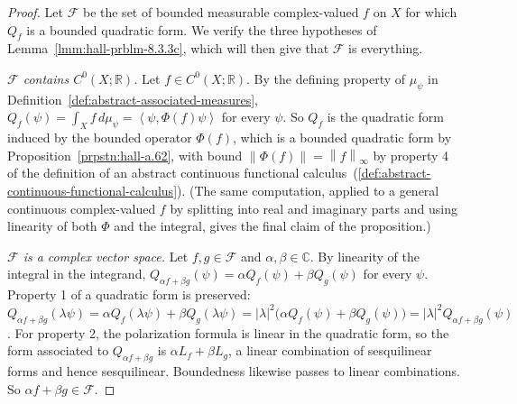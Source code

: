 \begin{proof}
    \leanok
Let $\mathcal{F}$ be the set of bounded measurable complex-valued $f$ on $X$ for which $Q_f$ is a bounded quadratic form. We verify the three hypotheses of Lemma~\ref{lmm:hall-prblm-8.3.3c}, which will then give that $\mathcal{F}$ is everything.

\textit{$\mathcal{F}$ contains $C^0(X;\mathbb{R})$.} Let $f \in C^0(X;\mathbb{R})$. By the defining property of $\mu_\psi$ in Definition~\ref{def:abstract-associated-measures}, $Q_f(\psi) = \int_X f \, d\mu_\psi = \left< \psi, \Phi(f)\psi \right>$ for every $\psi$. So $Q_f$ is the quadratic form induced by the bounded operator $\Phi(f)$, which is a bounded quadratic form by Proposition~\ref{prpstn:hall-a.62}, with bound $\left\| \Phi(f) \right\| = \left\| f \right\|_\infty$ by property 4 of the definition of an abstract continuous functional calculus~(\ref{def:abstract-continuous-functional-calculus}). (The same computation, applied to a general continuous complex-valued $f$ by splitting into real and imaginary parts and using linearity of both $\Phi$ and the integral, gives the final claim of the proposition.)

\textit{$\mathcal{F}$ is a complex vector space.} Let $f,g \in \mathcal{F}$ and $\alpha,\beta\in\mathbb{C}$. By linearity of the integral in the integrand, $Q_{\alpha f + \beta g}(\psi) = \alpha Q_f(\psi) + \beta Q_g(\psi)$ for every $\psi$. Property 1 of a quadratic form is preserved: $Q_{\alpha f+\beta g}(\lambda\psi) = \alpha Q_f(\lambda\psi) + \beta Q_g(\lambda\psi) = \lvert \lambda \rvert^2\big( \alpha Q_f(\psi) + \beta Q_g(\psi) \big) = \lvert\lambda\rvert^2 Q_{\alpha f+\beta g}(\psi)$. For property 2, the polarization formula is linear in the quadratic form, so the form associated to $Q_{\alpha f + \beta g}$ is $\alpha L_f + \beta L_g$, a linear combination of sesquilinear forms and hence sesquilinear. Boundedness likewise passes to linear combinations. So $\alpha f + \beta g \in \mathcal{F}$.


\end{proof}
